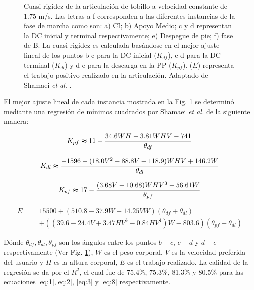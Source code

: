 \documentclass[12pt,english]{article}
\begin{document}
\begin{description}
\begin{figure}
\caption{\label{fig:Cuasi-rigidez-de-la}Cuasi-rigidez de la articulación de
tobillo a velocidad constante de 1.75 m/s. Las letras a-f corresponden
a las diferentes instancias de la fase de marcha como son: a) CI;
b) Apoyo Medio; c y d representan la DC inicial y terminal respectivamente;
e) Despegue de pie; f) fase de B. La cuasi-rigidez es calculada basándose
en el mejor ajuste lineal de los puntos b-c para la DC inicial ($K_{df}$),
c-d para la DC terminal ($K_{dl}$) y d-e para la descarga en la PP
($K_{pf}$). ($E$) representa el trabajo positivo realizado en la
articulación. Adaptado de Shamaei \emph{et al.} \cite{Shamaei2013}.}
\end{figure}



El mejor ajuste lineal de cada instancia mostrada en la Fig. \ref{fig:Cuasi-rigidez-de-la} se determinó mediante una regresión de mínimos cuadrados por Shamaei \emph{et al.} \cite{Shamaei2013} de la siguiente manera:


\begin{equation}
K_{pf}\thickapprox 11+\frac{34.6WH-3.81WHV-741}{\theta_{df}} \label{eq:1}
\end{equation}



\begin{equation}
K_{dl}\thickapprox \frac{-1596-(18.0V^{2}-88.8V+118.9)WHV+146.2W}{\theta_{dl}} \label{eq:2}
\end{equation}



\begin{equation}
K_{pf}\thickapprox 17-\frac{(3.68V-10.68)WHV^{3}-56.61W}{\theta_{pf}} \label{eq:3}
\end{equation}

\begin{eqnarray}
E &=&15500+(510.8-37.9W+14.25VW)(\theta_{df}+\theta_{dl}) \nonumber \\ && +((39.6-24.4V+3.47HV^{3}-0.84HV^{4})W-803.6)(\theta_{pf}-\theta_{dl})\label{eq:8}
\end{eqnarray}




Dónde $\theta_{df},\theta_{dl},\theta_{pf}$ son los ángulos entre
los puntos $b-c$, $c-d$ y $d-e$ respectivamente (Ver Fig. \ref{fig:Cuasi-rigidez-de-la}),
$W$ es el peso corporal, $V$ es la velocidad preferida del usuario y $H$ es
la altura corporal, $E$ es el trabajo realizado. La calidad de la regresión se da por el $R^{2}$, el cual fue de 75.4\%, 75.3\%, 81.3\% y 80.5\% para las ecuaciones \ref{eq:1},\ref{eq:2}, \ref{eq:3} y \ref{eq:8} respectivamente.


\end{description}
\end{document}
